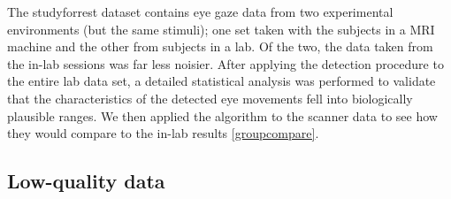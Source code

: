 \documentclass[10pt,a4paper]{extarticle}
\begin{document}
The studyforrest dataset contains eye gaze data from two experimental environments (but the same stimuli); one set taken with the subjects in a MRI machine and the other from subjects in a lab. Of the two, the data taken from the in-lab sessions was far less noisier. After applying the detection procedure to the entire lab data set, a detailed statistical analysis was performed to validate that the characteristics of the detected eye movements fell into biologically plausible ranges. We then applied the algorithm to the scanner data to see how they would compare to the in-lab results \ref{groupcompare}. 

\subsection*{Low-quality data}
\end{document}

